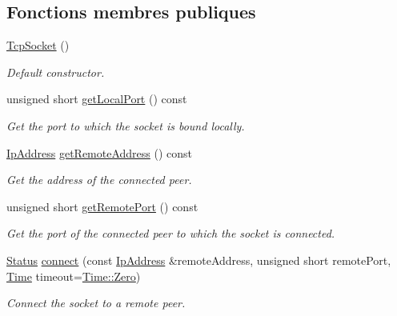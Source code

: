 \subsection*{Fonctions membres publiques}
\begin{DoxyCompactItemize}
\item 
\mbox{\label{classsf_1_1TcpSocket_a62a9bf81fd7f15fedb29fd1348483236}} 
\hyperlink{classsf_1_1TcpSocket_a62a9bf81fd7f15fedb29fd1348483236}{Tcp\+Socket} ()
\begin{DoxyCompactList}\small\item\em Default constructor. \end{DoxyCompactList}\item 
unsigned short \hyperlink{classsf_1_1TcpSocket_a98e45f0f49af1fd99216b9195e86d86b}{get\+Local\+Port} () const
\begin{DoxyCompactList}\small\item\em Get the port to which the socket is bound locally. \end{DoxyCompactList}\item 
\hyperlink{classsf_1_1IpAddress}{Ip\+Address} \hyperlink{classsf_1_1TcpSocket_aa8579c203b1fd21beb74d7f76444a94c}{get\+Remote\+Address} () const
\begin{DoxyCompactList}\small\item\em Get the address of the connected peer. \end{DoxyCompactList}\item 
unsigned short \hyperlink{classsf_1_1TcpSocket_a93bced0afd4b1c60797a85725be04951}{get\+Remote\+Port} () const
\begin{DoxyCompactList}\small\item\em Get the port of the connected peer to which the socket is connected. \end{DoxyCompactList}\item 
\hyperlink{classsf_1_1Socket_a51bf0fd51057b98a10fbb866246176dc}{Status} \hyperlink{classsf_1_1TcpSocket_a68cd42d5ab70ab54b16787f555951c40}{connect} (const \hyperlink{classsf_1_1IpAddress}{Ip\+Address} \&remote\+Address, unsigned short remote\+Port, \hyperlink{classsf_1_1Time}{Time} timeout=\hyperlink{classsf_1_1Time_a8db127b632fa8da21550e7282af11fa0}{Time\+::\+Zero})
\begin{DoxyCompactList}\small\item\em Connect the socket to a remote peer. \end{DoxyCompactList}\item 

\end{DoxyCompactItemize}

